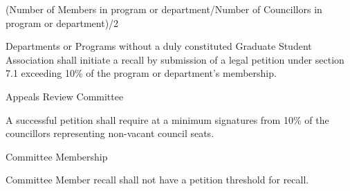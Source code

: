 \begin{longenum}[ label*=\thesubsection.\arabic*., align=left]
\begin{longenum}[ label*=\arabic*., align=left]
(Number of Members in program or department/Number of Councillors in program or department)/2
	\item Departments or Programs without a duly constituted Graduate Student Association shall initiate a recall by submission of a legal petition under section 7.1 exceeding 10\% of the program or department's membership.
	\end{longenum}    
	\item Appeals Review Committee
    \begin{longenum}[ label*=\arabic*., align=left]
		\item A successful petition shall require at a minimum signatures from 10\% of the councillors representing non-vacant council seats.
	\end{longenum}
    \item{Committee Membership}
    \begin{longenum}
    \item Committee Member recall shall not have a petition threshold for recall. 
    \end{longenum}
\end{longenum}

